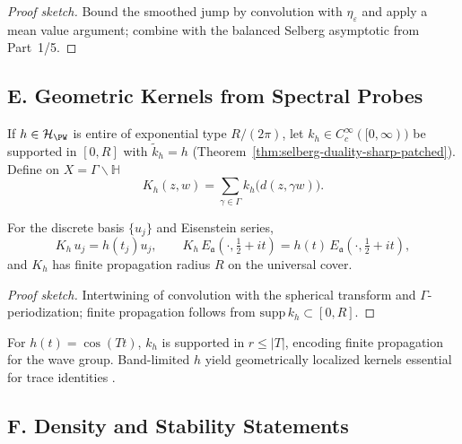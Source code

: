 \begin{proof}[Proof sketch]
Bound the smoothed jump by convolution with $\eta_\varepsilon$ and apply a mean value argument; combine with the balanced Selberg asymptotic from Part~1/5.
\end{proof}


\subsection*{E. Geometric Kernels from Spectral Probes}
\label{subsec:kernels-sharp-patched}

\begin{definition}
\label{def:Kh}
If $h\in\mathcal H_{\PW}$ is entire of exponential type $R/(2\pi)$, let $k_h\in C_c^\infty([0,\infty))$ be supported in $[0,R]$ with $\widetilde k_h=h$ (Theorem~\ref{thm:selberg-duality-sharp-patched}). Define on $X=\Gamma\backslash\mathbb H$
\[
  K_h(z,w)=\sum_{\gamma\in\Gamma} k_h\big(d(z,\gamma w)\big).
\]
\end{definition}

\begin{theorem}
\label{thm:Kh-action-sharp-patched}
For the discrete basis $\{u_j\}$ and Eisenstein series,
\[
  K_h\,u_j=h(t_j)u_j,\qquad
  K_h\,E_{\mathfrak a}(\cdot,\tfrac12+it)=h(t)\,E_{\mathfrak a}(\cdot,\tfrac12+it),
\]
and $K_h$ has finite propagation radius $R$ on the universal cover.
\end{theorem}

\begin{proof}[Proof sketch]
Intertwining of convolution with the spherical transform and $\Gamma$-periodization; finite propagation follows from $\mathrm{supp}\,k_h\subset[0,R]$.
\end{proof}

\begin{remark}
For $h(t)=\cos(Tt)$, $k_h$ is supported in $r\le|T|$, encoding finite propagation for the wave group. Band-limited $h$ yield geometrically localized kernels essential for trace identities \cite{Selberg1956,Hejhal1983}.
\end{remark}


\subsection*{F. Density and Stability Statements}
\label{subsec:density-stability}

